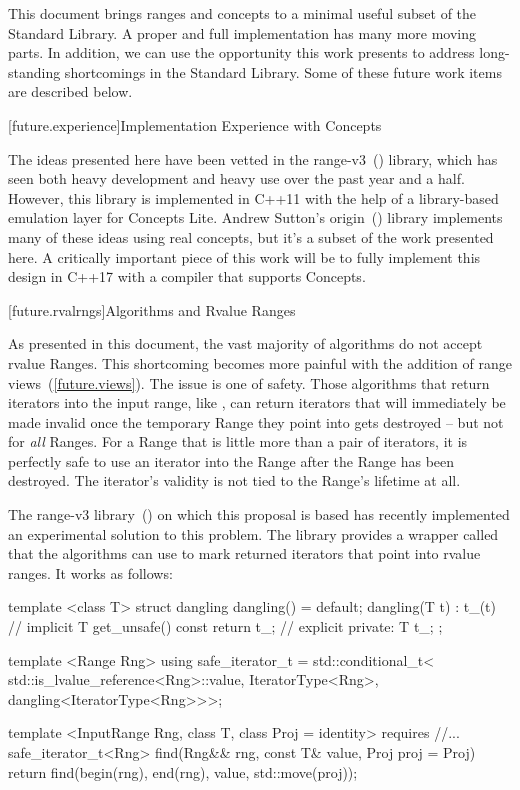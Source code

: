 
\pnum
This document brings ranges and concepts to a minimal useful subset of the Standard Library.
A proper and full implementation has many more moving parts. In addition, we can use the opportunity
this work presents to address long-standing shortcomings in the Standard Library. Some of these
future work items are described below.

[future.experience]{Implementation Experience with Concepts}

\pnum
The ideas presented here have been vetted in the range-v3~(\cite{range-v3}) library, which has seen both heavy
development and heavy use over the past year and a half. However, this library is implemented in
C++11 with the help of a library-based emulation layer for Concepts Lite. Andrew Sutton's origin~(\cite{origin})
library implements many of these ideas using real concepts, but it's a subset of the work presented
here. A critically important piece of this work will be to fully implement this design in C++17 with
a compiler that supports Concepts.

[future.rvalrngs]{Algorithms and Rvalue Ranges}

\pnum
As presented in this document, the vast majority of algorithms do not accept rvalue Ranges.
This shortcoming becomes more painful with the addition of range views~(\ref{future.views}).
The issue is one of safety. Those algorithms that return iterators into the input range, like
, can return iterators that will immediately be made invalid once the temporary
Range they point into gets destroyed -- but not for \textit{all}
Ranges. For a Range that
is little more than a pair of iterators, it is perfectly safe to use an iterator into the
Range
after the Range has been destroyed. The iterator's validity is not tied to the
Range's lifetime at all.

\pnum
The range-v3 library~(\cite{range-v3}) on which this proposal is based has recently implemented an
experimental solution to this problem. The library provides a wrapper called 
that the algorithms can use to mark returned iterators that point into rvalue ranges. It works
as follows:

\begin{codeblock}
  template <class T>
  struct dangling {
    dangling() = default;
    dangling(T t) : t_(t) {}            // implicit
    T get_unsafe() const { return t_; } // explicit
  private:
    T t_;
  };

  template <Range Rng>
  using safe_iterator_t =
    std::conditional_t<
      std::is_lvalue_reference<Rng>::value,
      IteratorType<Rng>,
      dangling<IteratorType<Rng>>>;

  template <InputRange Rng, class T, class Proj = identity>
    requires //...
    safe_iterator_t<Rng>
      find(Rng&& rng, const T& value, Proj proj = Proj{}) {
        return find(begin(rng), end(rng), value, std::move(proj));
      }
\end{codeblock}

